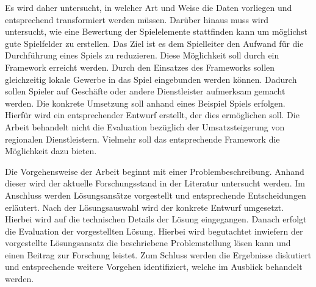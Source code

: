 Es wird daher untersucht, in welcher Art und Weise die Daten vorliegen und entsprechend transformiert werden müssen.
Darüber hinaus muss wird untersucht, wie eine Bewertung der Spielelemente stattfinden kann um möglichst gute Spielfelder zu erstellen.
Das Ziel ist es dem Spielleiter den Aufwand für die Durchführung eines Spiels zu reduzieren. Diese Möglichkeit soll durch ein Framework erreicht werden. Durch den Einsatzes des Frameworks sollen gleichzeitig lokale Gewerbe in das Spiel eingebunden werden können. Dadurch sollen Spieler auf Geschäfte oder andere Dienstleister aufmerksam gemacht werden.
Die konkrete Umsetzung soll anhand eines Beispiel Spiels erfolgen.
Hierfür wird ein entsprechender Entwurf erstellt, der dies ermöglichen soll.
Die Arbeit behandelt nicht die Evaluation bezüglich der Umsatzsteigerung von regionalen Dienstleistern. Vielmehr soll das entsprechende Framework die Möglichkeit dazu bieten.

Die Vorgehensweise der Arbeit beginnt mit einer Problembeschreibung. Anhand dieser wird der aktuelle Forschungsstand in der Literatur untersucht werden. Im Anschluss werden Lösungsansätze vorgestellt und entsprechende Entscheidungen erläutert. Nach der Lösungsauswahl wird der konkrete Entwurf umgesetzt. Hierbei wird auf die technischen Details der Lösung eingegangen. Danach erfolgt die Evaluation der vorgestellten Lösung. Hierbei wird begutachtet inwiefern der vorgestellte Lösungsansatz die beschriebene Problemstellung lösen kann und einen Beitrag zur Forschung leistet. Zum Schluss werden die Ergebnisse diskutiert und entsprechende weitere Vorgehen identifiziert, welche im Ausblick behandelt werden.

